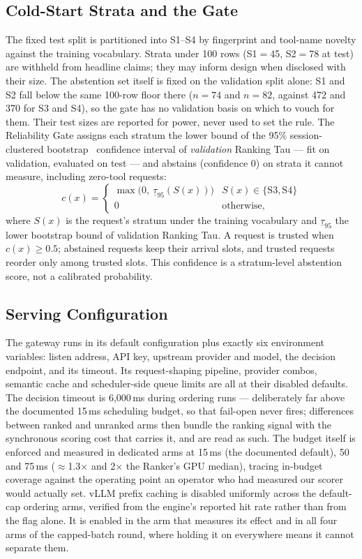 \subsection{Cold-Start Strata and the Gate}
The fixed test split is partitioned into S1--S4 by fingerprint and
tool-name novelty against the training vocabulary. Strata under 100 rows
(S1$=$45, S2$=$78 at test) are withheld from headline claims; they may
inform design when disclosed with their size. The abstention set itself is
fixed on the validation split alone: S1 and S2 fall below the same 100-row
floor there ($n{=}74$ and $n{=}82$, against 472 and 370 for S3 and S4), so
the gate has no validation basis on which to vouch for them. Their test
sizes are reported for power, never used to set the rule. The Reliability Gate assigns each stratum the
lower bound of the 95\% session-clustered bootstrap~\cite{efron1979}
confidence interval of
\emph{validation} Ranking Tau --- fit on validation, evaluated on test ---
and abstains (confidence 0) on strata it cannot measure, including zero-tool
requests:
\begin{equation}
c(x) = \begin{cases}
  \max\bigl(0,\ \underline{\tau}_{95}(S(x))\bigr) & S(x) \in \{\mathrm{S3},\mathrm{S4}\} \\
  0 & \text{otherwise,}
\end{cases}
\end{equation}
where $S(x)$ is the request's stratum under the training vocabulary and
$\underline{\tau}_{95}$ the lower bootstrap bound of validation Ranking Tau.
A request is trusted when $c(x) \ge 0.5$; abstained requests keep their
arrival slots, and trusted requests reorder only among trusted slots. This confidence is a stratum-level abstention score, not a
calibrated probability.

\subsection{Serving Configuration}
The gateway runs in its default configuration plus exactly six
environment variables: listen address, API key, upstream provider and
model, the decision endpoint, and its timeout. Its request-shaping
pipeline, provider combos, semantic cache and scheduler-side queue
limits are all at their disabled defaults. The decision timeout is
6{,}000\,ms during ordering runs --- deliberately far above the
documented 15\,ms scheduling budget, so that fail-open never fires;
differences between ranked and unranked arms then bundle the ranking
signal with the synchronous scoring cost that carries it, and are read
as such. The budget itself is enforced and measured in dedicated arms
at 15\,ms (the documented default), 50 and 75\,ms
($\approx$1.3$\times$ and 2$\times$ the Ranker's GPU median), tracing
in-budget coverage against the operating point an operator who had
measured our scorer would actually set. vLLM prefix caching is disabled uniformly across the default-cap
ordering arms, verified from the engine's reported hit rate rather
than from the flag alone. It is enabled in the arm that measures its
effect and in all four arms of the capped-batch round, where holding it
on everywhere means it cannot separate them.

